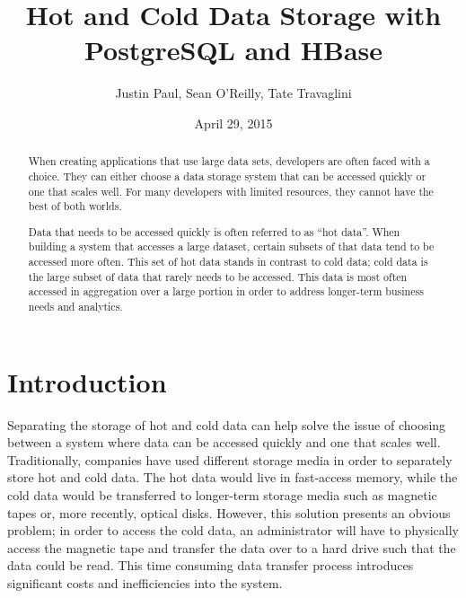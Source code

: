 \documentclass[12pt]{article}
\begin{document}
\title{Hot and Cold Data Storage with PostgreSQL and HBase}
\author{Justin Paul, Sean O'Reilly, Tate Travaglini}
\date{April 29, 2015}
\maketitle

\begin{abstract}
When creating applications that use large data sets, developers are often faced with a choice. They can either choose a data storage system that can be accessed quickly or one that scales well. For many developers with limited resources, they cannot have the best of both worlds. 

Data that needs to be accessed quickly is often referred to as “hot data”. When building a system that accesses a large dataset, certain subsets of that data tend to be accessed more often. This set of hot data stands in contrast to cold data; cold data is the large subset of data that rarely needs to be accessed. This data is most often accessed in aggregation over a large portion in order to address longer-term business needs and analytics.
\end{abstract}

\section{Introduction}
Separating the storage of hot and cold data can help solve the issue of choosing between a system where data can be accessed quickly and one that scales well. Traditionally, companies have used different storage media in order to separately store hot and cold data. The hot data would live in fast-access memory, while the cold data would be transferred to longer-term storage media such as magnetic tapes or, more recently, optical disks. However, this solution presents an obvious problem; in order to access the cold data, an administrator will have to physically access the magnetic tape and transfer the data over to a hard drive such that the data could be read. This time consuming data transfer process introduces significant costs and inefficiencies into the system. 
\end{document}
